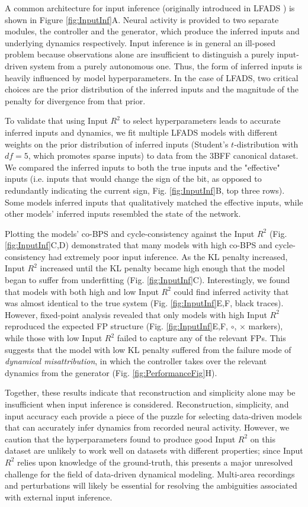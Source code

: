\documentclass{article}
\begin{document}
A common architecture for input inference (originally introduced in LFADS \cite{pandarinath_inferring_2018}) is shown in Figure \ref{fig:InputInf}A. Neural activity is provided to two separate modules, the controller and the generator, which produce the inferred inputs and underlying dynamics respectively. Input inference is in general an ill-posed problem because observations alone are insufficient to distinguish a purely input-driven system from a purely autonomous one. Thus, the form of inferred inputs is heavily influenced by model hyperparameters. In the case of LFADS, two critical choices are the prior distribution of the inferred inputs and the magnitude of the penalty for divergence from that prior.

To validate that using Input $R^2$ to select hyperparameters leads to accurate inferred inputs and dynamics, we fit multiple LFADS models with different weights on the prior distribution of inferred inputs (Student’s $t$-distribution with $df = 5$, which promotes sparse inputs) to data from the 3BFF canonical dataset. We compared the inferred inputs to both the true inputs and the "effective" inputs (i.e. inputs that would change the sign of the bit, as opposed to redundantly indicating the current sign, Fig. \ref{fig:InputInf}B, top three rows). Some models inferred inputs that qualitatively matched the effective inputs, while other models’ inferred inputs resembled the state of the network.

Plotting the models’ co-BPS and cycle-consistency against the Input $R^2$ (Fig. \ref{fig:InputInf}C,D) demonstrated that many models with high co-BPS and cycle-consistency had extremely poor input inference. As the KL penalty increased, Input $R^2$ increased until the KL penalty became high enough that the model began to suffer from underfitting (Fig. \ref{fig:InputInf}C). Interestingly, we found that models with both high and low Input $R^2$ could find inferred activity that was almost identical to the true system (Fig. \ref{fig:InputInf}E,F, black traces). However, fixed-point analysis revealed that only models with high Input $R^2$ reproduced the expected FP structure (Fig. \ref{fig:InputInf}E,F, $\circ$, $\times$ markers), while those with low Input $R^2$ failed to capture any of the relevant FPs. This suggests that the model with low KL penalty suffered from the failure mode of \textit{dynamical misattribution}, in which the controller takes over the relevant dynamics from the generator (Fig. \ref{fig:PerformanceFig}H).

Together, these results indicate that reconstruction and simplicity alone may be insufficient when input inference is considered. Reconstruction, simplicity, and input accuracy each provide a piece of the puzzle for selecting data-driven models that can accurately infer dynamics from recorded neural activity. However, we caution that the hyperparameters found to produce good Input $R^2$ on this dataset are unlikely to work well on datasets with different properties; since Input $R^2$ relies upon knowledge of the ground-truth, this presents a major unresolved challenge for the field of data-driven dynamical modeling. Multi-area recordings and perturbations will likely be essential for resolving the ambiguities associated with external input inference.
\end{document}
